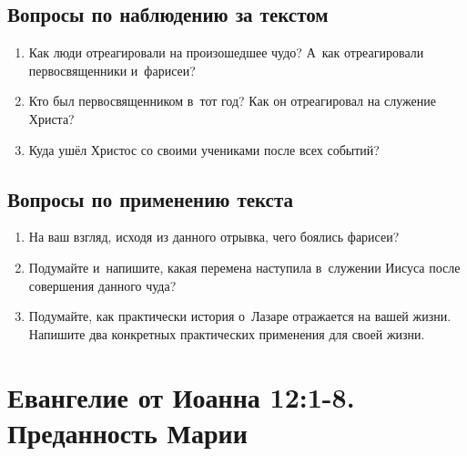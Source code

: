 \documentclass[a4paper,12pt]{article}
\begin{document}
\subsection*{Вопросы по наблюдению за текстом}
\begin{enumerate}
    \item Как люди отреагировали на произошедшее чудо? А~как отреагировали первосвященники и~фарисеи? 
    
    \myline
    
    \myline
    \item Кто был первосвященником в~тот год? Как он отреагировал на служение Христа? 
    
    \myline
    
    \myline
    \item Куда ушёл Христос со своими учениками после всех событий? 
    
    \myline
    
    \myline
\end{enumerate}

\subsection*{Вопросы по применению текста} 
\begin{enumerate}
    \item На ваш взгляд, исходя из данного отрывка, чего боялись фарисеи? 
    
    \myline
    
    \myline
    \item Подумайте и~напишите, какая перемена наступила в~служении Иисуса после совершения данного чуда? 
    
    \myline
    
    \myline
    \item Подумайте, как практически история о~Лазаре отражается на вашей жизни. Напишите два конкретных практических применения для своей жизни. 
    
    \myline
    
    \myline
\end{enumerate}



\section{Евангелие от Иоанна 12:1-8. Преданность Марии}
\end{document}
